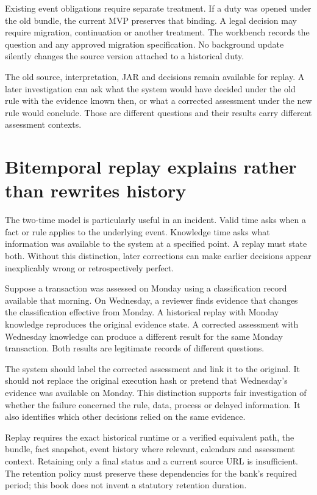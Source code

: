 Existing event obligations require separate treatment. If a duty was opened under
the old bundle, the current MVP preserves that binding. A legal decision may
require migration, continuation or another treatment. The workbench records the
question and any approved migration specification. No background update silently
changes the source version attached to a historical duty.

The old source, interpretation, JAR and decisions remain available for replay.
A later investigation can ask what the system would have decided under the old
rule with the evidence known then, or what a corrected assessment under the new
rule would conclude. Those are different questions and their results carry
different assessment contexts.

\section{Bitemporal replay explains rather than rewrites history}

The two-time model is particularly useful in an incident. Valid time asks when a
fact or rule applies to the underlying event. Knowledge time asks what information
was available to the system at a specified point. A replay must state both.
Without this distinction, later corrections can make earlier decisions appear
inexplicably wrong or retrospectively perfect.

Suppose a transaction was assessed on Monday using a classification record
available that morning. On Wednesday, a reviewer finds evidence that changes the
classification effective from Monday. A historical replay with Monday knowledge
reproduces the original evidence state. A corrected assessment with Wednesday
knowledge can produce a different result for the same Monday transaction. Both
results are legitimate records of different questions.

The system should label the corrected assessment and link it to the original.
It should not replace the original execution hash or pretend that Wednesday's
evidence was available on Monday. This distinction supports fair investigation
of whether the failure concerned the rule, data, process or delayed information.
It also identifies which other decisions relied on the same evidence.

Replay requires the exact historical runtime or a verified equivalent path, the
bundle, fact snapshot, event history where relevant, calendars and assessment
context. Retaining only a final status and a current source URL is insufficient.
The retention policy must preserve these dependencies for the bank's required
period; this book does not invent a statutory retention duration.

